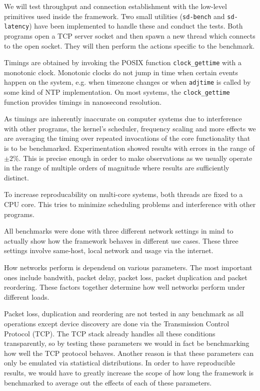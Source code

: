 We will test throughput and connection establishment with the low-level primitives used inside the framework.
Two small utilities (\lstinline{sd-bench} and \lstinline{sd-latency}) have been implemented to handle these and conduct the tests.
Both programs open a TCP server socket and then spawn a new thread which connects to the open socket.
They will then perform the actions specific to the benchmark.

Timings are obtained by invoking the POSIX function \lstinline{clock_gettime} with a monotonic clock.
Monotonic clocks do not jump in time when certain events happen on the system, e.g. when timezone changes or when \lstinline{adjtime} is called by some kind of NTP implementation.
On most systems, the \lstinline{clock_gettime} function provides timings in nanosecond resolution.

As timings are inherently inaccurate on computer systems due to interference with other programs, the kernel's scheduler, frequency scaling and more effects we are averaging the timing over repeated invocations of the core functionality that is to be benchmarked.
Experimentation showed results with errors in the range of $\pm2\%$.
This is precise enough in order to make observations as we usually operate in the range of multiple orders of magnitude where results are sufficiently distinct.

To increase reproducability on multi-core systems, both threads are fixed to a CPU core.
This tries to minimize scheduling problems and interference with other programs.

\medskip

All benchmarks were done with three different network settings in mind to actually show how the framework behaves in different use cases.
These three settings involve same-host, local network and usage via the internet.

How networks perform is dependend on various parameters.
The most important ones include bandwith, packet delay, packet loss, packet duplication and packet reordering.
These factors together determine how well networks perform under different loads.

Packet loss, duplication and reordering are not tested in any benchmark as all operations except device discovery are done via the Transmission Control Protocol (TCP).
The TCP stack already handles all these conditions transparently, so by testing these parameters we would in fact be benchmarking how well the TCP protocol behaves.
Another reason is that these parameters can only be emulated via statistical distributions.
In order to have reproducible results, we would have to greatly increase the scope of how long the framework is benchmarked to average out the effects of each of these parameters.

